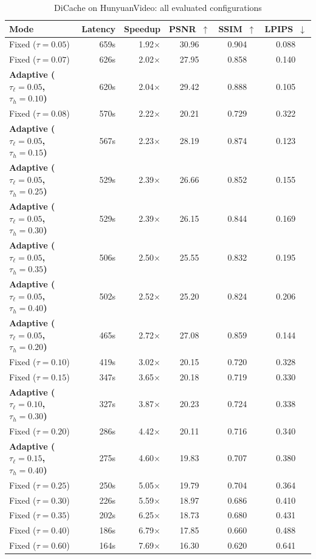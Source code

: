 \documentclass{article}
\begin{document}
\begin{table}[htbp]
\centering
\footnotesize
\setlength{\tabcolsep}{5pt}
\caption{DiCache on HunyuanVideo: all evaluated configurations}
\label{tab:app-dc-hv}
\begin{tabular}{lrrccc}
\toprule
\textbf{Mode} & \textbf{Latency} & \textbf{Speedup} & \textbf{PSNR~$\uparrow$} & \textbf{SSIM~$\uparrow$} & \textbf{LPIPS~$\downarrow$} \\
\midrule
  Fixed ($\tau=0.05$) & 659s & 1.92$\times$ & 30.96 & 0.904 & 0.088 \\
  Fixed ($\tau=0.07$) & 626s & 2.02$\times$ & 27.95 & 0.858 & 0.140 \\
  \textbf{Adaptive ($\tau_\ell=0.05$, $\tau_h=0.10$)} & 620s & 2.04$\times$ & 29.42 & 0.888 & 0.105 \\
  Fixed ($\tau=0.08$) & 570s & 2.22$\times$ & 20.21 & 0.729 & 0.322 \\
  \textbf{Adaptive ($\tau_\ell=0.05$, $\tau_h=0.15$)} & 567s & 2.23$\times$ & 28.19 & 0.874 & 0.123 \\
  \textbf{Adaptive ($\tau_\ell=0.05$, $\tau_h=0.25$)} & 529s & 2.39$\times$ & 26.66 & 0.852 & 0.155 \\
  \textbf{Adaptive ($\tau_\ell=0.05$, $\tau_h=0.30$)} & 529s & 2.39$\times$ & 26.15 & 0.844 & 0.169 \\
  \textbf{Adaptive ($\tau_\ell=0.05$, $\tau_h=0.35$)} & 506s & 2.50$\times$ & 25.55 & 0.832 & 0.195 \\
  \textbf{Adaptive ($\tau_\ell=0.05$, $\tau_h=0.40$)} & 502s & 2.52$\times$ & 25.20 & 0.824 & 0.206 \\
  \textbf{Adaptive ($\tau_\ell=0.05$, $\tau_h=0.20$)} & 465s & 2.72$\times$ & 27.08 & 0.859 & 0.144 \\
  Fixed ($\tau=0.10$) & 419s & 3.02$\times$ & 20.15 & 0.720 & 0.328 \\
  Fixed ($\tau=0.15$) & 347s & 3.65$\times$ & 20.18 & 0.719 & 0.330 \\
  \textbf{Adaptive ($\tau_\ell=0.10$, $\tau_h=0.30$)} & 327s & 3.87$\times$ & 20.23 & 0.724 & 0.338 \\
  Fixed ($\tau=0.20$) & 286s & 4.42$\times$ & 20.11 & 0.716 & 0.340 \\
  \textbf{Adaptive ($\tau_\ell=0.15$, $\tau_h=0.40$)} & 275s & 4.60$\times$ & 19.83 & 0.707 & 0.380 \\
  Fixed ($\tau=0.25$) & 250s & 5.05$\times$ & 19.79 & 0.704 & 0.364 \\
  Fixed ($\tau=0.30$) & 226s & 5.59$\times$ & 18.97 & 0.686 & 0.410 \\
  Fixed ($\tau=0.35$) & 202s & 6.25$\times$ & 18.73 & 0.680 & 0.431 \\
  Fixed ($\tau=0.40$) & 186s & 6.79$\times$ & 17.85 & 0.660 & 0.488 \\
  Fixed ($\tau=0.60$) & 164s & 7.69$\times$ & 16.30 & 0.620 & 0.641 \\
\bottomrule
\end{tabular}
\end{table}
\end{document}
